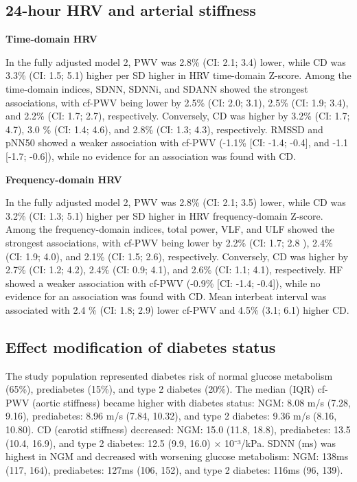 \documentclass[
  a4paper,
  headsepline=true,
  open=any]{scrbook}
\begin{document}
\hypertarget{hour-hrv-and-arterial-stiffness}{%
\subsection{24-hour HRV and arterial
stiffness}\label{hour-hrv-and-arterial-stiffness}}

\textbf{Time-domain HRV}

In the fully adjusted model 2, PWV was 2.8\% (CI: 2.1; 3.4) lower, while
CD was 3.3\% (CI: 1.5; 5.1) higher per SD higher in HRV time-domain
Z-score. Among the time-domain indices, SDNN, SDNNi, and SDANN showed
the strongest associations, with cf-PWV being lower by 2.5\% (CI: 2.0;
3.1), 2.5\% (CI: 1.9; 3.4), and 2.2\% (CI: 1.7; 2.7), respectively.
Conversely, CD was higher by 3.2\% (CI: 1.7; 4.7), 3.0 \% (CI: 1.4;
4.6), and 2.8\% (CI: 1.3; 4.3), respectively. RMSSD and pNN50 showed a
weaker association with cf-PWV (-1.1\% {[}CI: -1.4; -0.4{]}, and -1.1
{[}-1.7; -0.6{]}), while no evidence for an association was found with
CD.

\textbf{Frequency-domain HRV}

In the fully adjusted model 2, PWV was 2.8\% (CI: 2.1; 3.5) lower, while
CD was 3.2\% (CI: 1.3; 5.1) higher per SD higher in HRV frequency-domain
Z-score. Among the frequency-domain indices, total power, VLF, and ULF
showed the strongest associations, with cf-PWV being lower by 2.2\% (CI:
1.7; 2.8 ), 2.4\% (CI: 1.9; 4.0), and 2.1\% (CI: 1.5; 2.6),
respectively. Conversely, CD was higher by 2.7\% (CI: 1.2; 4.2), 2.4\%
(CI: 0.9; 4.1), and 2.6\% (CI: 1.1; 4.1), respectively. HF showed a
weaker association with cf-PWV (-0.9\% {[}CI: -1.4; -0.4{]}), while no
evidence for an association was found with CD. Mean interbeat interval
was associated with 2.4 \% (CI: 1.8; 2.9) lower cf-PWV and 4.5\% (3.1;
6.1) higher CD.

\hypertarget{effect-modification-of-diabetes-status}{%
\subsection{Effect modification of diabetes
status}\label{effect-modification-of-diabetes-status}}

The study population represented diabetes risk of normal glucose
metabolism (65\%), prediabetes (15\%), and type 2 diabetes (20\%). The
median (IQR) cf-PWV (aortic stiffness) became higher with diabetes
status: NGM: 8.08 m/s (7.28, 9.16), prediabetes: 8.96 m/s (7.84, 10.32),
and type 2 diabetes: 9.36 m/s (8.16, 10.80). CD (carotid stiffness)
decreased: NGM: 15.0 (11.8, 18.8), prediabetes: 13.5 (10.4, 16.9), and
type 2 diabetes: 12.5 (9.9, 16.0) × 10⁻³/kPa. SDNN (ms) was highest in
NGM and decreased with worsening glucose metabolism: NGM: 138ms (117,
164), prediabetes: 127ms (106, 152), and type 2 diabetes: 116ms (96,
139).
\end{document}
